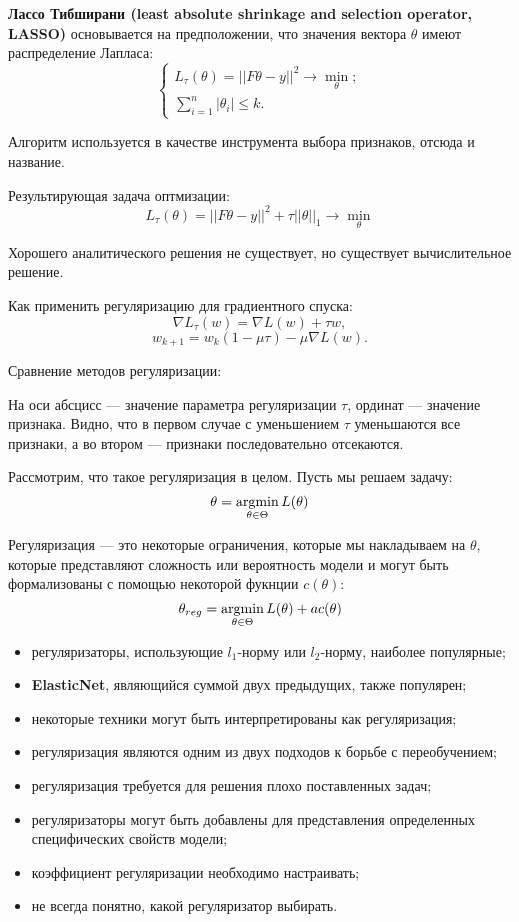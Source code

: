 \textbf{Лассо Тибширани (least absolute shrinkage and selection operator, LASSO)}
основывается на предположении, что значения вектора $\theta$
имеют распределение Лапласа:
\[
    \begin{cases}
        L_\tau(\theta) = ||F\theta - y||^2 \to \min_\theta;\\
        \sum_{i = 1}^n |\theta_i| \leq k.
    \end{cases}
\]

Алгоритм используется в качестве инструмента выбора признаков, отсюда и
название.

Результирующая задача оптмизации:
\[
    L_\tau (\theta) = ||F\theta - y||^2 + \tau||\theta||_1 \to \min_\theta
\]

Хорошего аналитического решения не существует, но существует вычислительное
решение.

Как применить регуляризацию для градиентного спуска:
\[
    \nabla L_\tau(w) = \nabla L(w) + \tau w,
\]
\[
    w_{k+1} = w_k(1 - \mu\tau) - \mu\nabla L(w).
\]

Сравнение методов регуляризации:


На оси абсцисс --- значение параметра регуляризации $\tau$, ординат ---
значение признака. Видно, что в первом случае с уменьшением $\tau$ уменьшаются
все признаки, а во втором --- признаки последовательно отсекаются.

Рассмотрим, что такое регуляризация в целом. Пусть мы решаем задачу:
\[
    \theta = \operatorname*{argmin}_{\theta \in \Theta} L(\theta)
\]

Регуляризация --- это некоторые ограничения, которые мы накладываем на
$\theta$, которые представляют сложность или вероятность модели и могут быть
формализованы с помощью некоторой фукнции $c(\theta)$:
\[
    \theta_{reg} = \operatorname*{argmin}_{\theta \in \Theta} L(\theta) + ac(\theta)
\]

\begin{itemize}
    \item регуляризаторы, использующие $l_1$-норму или $l_2$-норму, наиболее
        популярные;

    \item \textbf{ElasticNet}, являющийся суммой двух предыдущих, также
        популярен;

    \item некоторые техники могут быть интерпретированы как регуляризация;

    \item регуляризация являются одним из двух подходов к борьбе с
        переобучением;

    \item регуляризация требуется для решения плохо поставленных задач;

    \item регуляризаторы могут быть добавлены для представления определенных
        специфических свойств модели;

    \item коэффициент регуляризации необходимо настраивать;

    \item не всегда понятно, какой регуляризатор выбирать.
\end{itemize}

